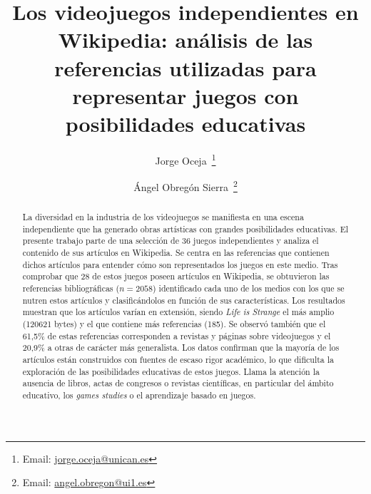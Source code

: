 \documentclass[spanish]{textolivre}
\title{Los videojuegos independientes en Wikipedia:
análisis de las referencias utilizadas para representar juegos con posibilidades educativas}
\author[1]{Jorge Oceja~\orcid{0000-0003-2377-9523}\thanks{Email: \href{mailto:jorge.oceja@unican.es}{jorge.oceja@unican.es}}}
\author[2]{Ángel Obregón Sierra~\orcid{0000-0001-8801-317X}\thanks{Email: \href{mailto:angel.obregon@ui1.es}{angel.obregon@ui1.es}}}
\affil[1]{Universidad de Cantabria, Facultad de Educación, Cantabria, España.}
\affil[2]{Universidad Isabel I, Facultad de Educación, Burgos, España.}
\begin{document}
\maketitle

\begin{polyabstract}
\begin{abstract}
La diversidad en la industria de los videojuegos se manifiesta en una escena independiente que ha generado obras artísticas con grandes posibilidades educativas. El presente trabajo parte de una selección de 36 juegos independientes y analiza el contenido de sus artículos en Wikipedia. Se centra en las referencias que contienen dichos artículos para entender cómo son representados los juegos en este medio. Tras comprobar que 28 de estos juegos poseen artículos en Wikipedia, se obtuvieron las referencias bibliográficas ($n = 2058$) identificado cada uno de los medios con los que se nutren estos artículos y clasificándolos en función de sus características. Los resultados muestran que los artículos varían en extensión, siendo \emph{Life is Strange} el más amplio (120621 bytes) y el que contiene más referencias (185). Se observó también que el 61,5\% de estas referencias corresponden a revistas y páginas sobre videojuegos y el 20,9\% a otras de carácter más generalista. Los datos confirman que la mayoría de los artículos están construidos con fuentes de escaso rigor académico, lo que dificulta la exploración de las posibilidades educativas de estos juegos. Llama la atención la ausencia de libros, actas de congresos o revistas científicas, en particular del ámbito educativo, los \textit{games studies} o el aprendizaje basado en juegos.

\end{abstract}


\end{polyabstract}
\end{document}
